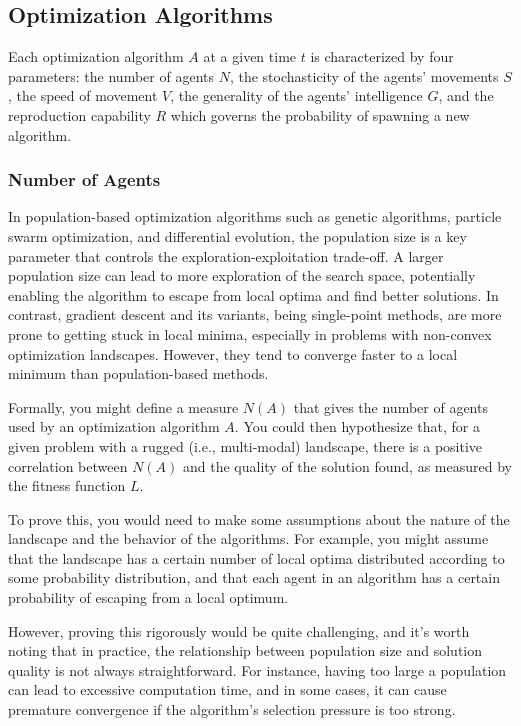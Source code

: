 \documentclass{article}[10pt]
\begin{document}
\subsection{Optimization Algorithms}
\label{subsection:optimizationAlgorithms}
Each optimization algorithm \( A \) at a given time \( t \) is characterized by four parameters: the number of agents \( N \), the stochasticity of the agents' movements \( S \), the speed of movement \( V \), the generality of the agents' intelligence $G$, and the reproduction capability \( R \) which governs the probability of spawning a new algorithm.\par

\subsubsection{Number of Agents}
\label{subsubsection:numberAgents}
In population-based optimization algorithms such as genetic algorithms, particle swarm optimization, and differential evolution, the population size is a key parameter that controls the exploration-exploitation trade-off. 
A larger population size can lead to more exploration of the search space, potentially enabling the algorithm to escape from local optima and find better solutions.
In contrast, gradient descent and its variants, being single-point methods, are more prone to getting stuck in local minima, especially in problems with non-convex optimization landscapes. 
However, they tend to converge faster to a local minimum than population-based methods.\par

Formally, you might define a measure \( N(A) \) that gives the number of agents used by an optimization algorithm \( A \). 
You could then hypothesize that, for a given problem with a rugged (i.e., multi-modal) landscape, there is a positive correlation between \( N(A) \) and the quality of the solution found, as measured by the fitness function \( L \).\par

To prove this, you would need to make some assumptions about the nature of the landscape and the behavior of the algorithms. 
For example, you might assume that the landscape has a certain number of local optima distributed according to some probability distribution, and that each agent in an algorithm has a certain probability of escaping from a local optimum.\par

However, proving this rigorously would be quite challenging, and it's worth noting that in practice, the relationship between population size and solution quality is not always straightforward. 
For instance, having too large a population can lead to excessive computation time, and in some cases, it can cause premature convergence if the algorithm's selection pressure is too strong. \par
\end{document}
